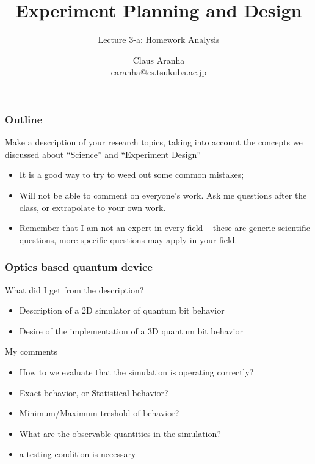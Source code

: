 \documentclass[10pt]{beamer}
\title[]{Experiment Planning and Design}
\subtitle[]{Lecture 3-a: Homework Analysis}
\author[Claus Aranha]{Claus Aranha\\{\footnotesize caranha@cs.tsukuba.ac.jp}}
\institute{Department of Computer Science}
\begin{document}
\begin{frame}
  \maketitle
\end{frame}

\begin{frame}
  \frametitle{Outline}
  \begin{block}{}
    Make a description of your research topics, taking into account
    the concepts we discussed about ``Science'' and ``Experiment
    Design''
  \end{block}

  \begin{itemize}
    \item It is a good way to try to weed out some common mistakes;
    \item Will not be able to comment on everyone's work. Ask me
      questions after the class, or extrapolate to your own work.
    \item Remember that I am not an expert in every field -- these are
      generic scientific questions, more specific questions may apply
      in your field.
  \end{itemize}
\end{frame}

\begin{frame}
  \frametitle{Optics based quantum device}
  \begin{block}{What did I get from the description?}
  \begin{itemize}
  \item Description of a 2D simulator of quantum bit behavior
  \item Desire of the implementation of a 3D quantum bit behavior
  \end{itemize}
  \end{block}
  \begin{block}{My comments}
    \begin{itemize}
    \item How to we evaluate that the simulation is operating correctly?
    \item Exact behavior, or Statistical behavior?
    \item Minimum/Maximum treshold of behavior?
    \item What are the observable quantities in the simulation?
    \item \alert{a testing condition is necessary}
    \end{itemize}
  \end{block}
\end{frame}
\end{document}
